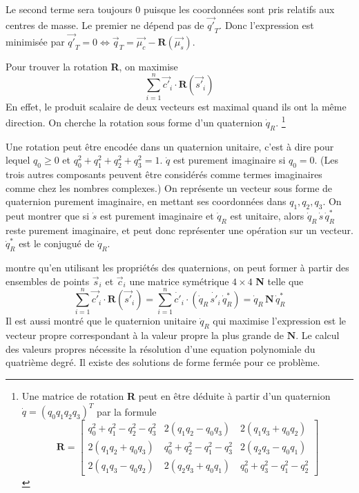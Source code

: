 \documentclass[a4paper,10pt]{scrreprt}
\begin{document}
Le second terme sera toujours $0$ puisque les coordonnées sont pris relatifs aux centres de masse. Le premier ne dépend pas de $\vec{q'}_T$. Donc l'expression est minimisée par $\vec{q'}_T = 0 \iff \vec{q}_T = \vec{\mu_c} - \mathbf{R}(\vec{\mu_s})$.

Pour trouver la rotation \textbf{R}, on maximise
\begin{equation*}
	\sum_{i=1}^{n} \vec{c'}_{i} \cdot \mathbf{R}(\vec{s'}_i)
\end{equation*}
En effet, le produit scalaire de deux vecteurs est maximal quand ils ont la même direction. On cherche la rotation sous forme d'un quaternion $\dot{q}_R$.
\footnote{Une matrice de rotation \textbf{R} peut en être déduite à partir d'un quaternion $\dot{q} = (q_0 q_1 q_2 q_3)^T$ par la formule
\begin{equation*}
	\mathbf{R} = \begin{bmatrix}
		q_0^2 + q_1^2 - q_2^2 - q_3^2 & 2(q_1 q_2 - q_0 q_3) & 2(q_1 q_3 + q_0 q_2) \\
		2(q_1 q_2 + q_0 q_3) & q_0^2 + q_2^2 - q_1^2 - q_3^2 & 2(q_2 q_3 - q_0 q_1) \\
		2(q_1 q_3 - q_0 q_2) & 2(q_2 q_3 + q_0 q_1) & q_0^2 + q_3^2 - q_1^2 - q_2^2
	\end{bmatrix}
\end{equation*}}

Une rotation peut être encodée dans un quaternion unitaire, c'est à dire pour lequel $q_0 \geq 0$ et $q_0^2 + q_1^2 + q_2^2 + q_3^2 = 1$. $\dot{q}$ est purement imaginaire si $q_0 = 0$. (Les trois autres composants peuvent être considérés comme termes imaginaires comme chez les nombres complexes.) On représente un vecteur sous forme de quaternion purement imaginaire, en mettant ses coordonnées dans $q_1, q_2, q_3$. On peut montrer que si $\dot{s}$ est purement imaginaire et $\dot{q}_R$ est unitaire, alors $\dot{q}_R \, \dot{s} \, \dot{q}^*_R$ reste purement imaginaire, et peut donc représenter une opération sur un vecteur. $\dot{q}^*_R$ est le conjugué de $\dot{q}_R$.

\cite{Horn1986} montre qu'en utilisant les propriétés des quaternions, on peut former à partir des ensembles de points $\vec{s}_i$ et $\vec{c}_i$ une matrice symétrique $4 \times 4$ \textbf{N} telle que
\begin{equation*}
	\sum_{i=1}^{n} \vec{c'}_{i} \cdot \mathbf{R}(\vec{s'}_i) =
	\sum_{i=1}^{n} \dot{c'}_{i} \cdot (\dot{q}_R \, \dot{s'}_{i} \, \dot{q}^*_R) =
	\dot{q}_R \, \mathbf{N} \, \dot{q}^*_R
\end{equation*}
Il est aussi montré que le quaternion unitaire $\dot{q}_R$ qui maximise l'expression est le vecteur propre correspondant à la valeur propre la plus grande de $\mathbf{N}$. Le calcul des valeurs propres nécessite la résolution d'une equation polynomiale du quatrième degré. Il existe des solutions de forme fermée pour ce problème.
\end{document}
